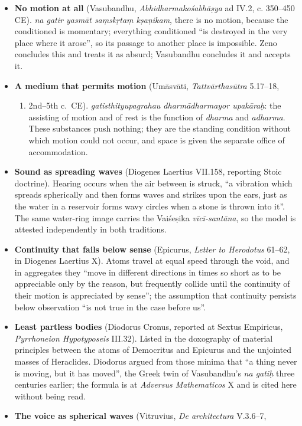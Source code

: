\documentclass[11pt,a4paper]{article}
\newcommand{\tightlist}{\setlength{\itemsep}{0pt}\setlength{\parskip}{0pt}}
\begin{document}
\begin{itemize}
  to 450 CE, argues the point from observation: the axe-blow is still
  heard at a distance after the axe-wood contact has ceased.
\item
  \textbf{No motion at all} (Vasubandhu, \emph{Abhidharmakośabhāṣya} ad
  IV.2, c. 350--450 CE). \emph{na gatir yasmāt saṃskṛtaṃ kṣaṇikam},
  there is no motion, because the conditioned is momentary; everything
  conditioned ``is destroyed in the very place where it arose'', so its
  passage to another place is impossible. Zeno concludes this and treats
  it as absurd; Vasubandhu concludes it and accepts it.
\item
  \textbf{A medium that permits motion} (Umāsvāti,
  \emph{Tattvārthasūtra} 5.17--18,

  \begin{enumerate}
  \def\labelenumi{\alph{enumi}.}
  \setcounter{enumi}{2}
  \tightlist
  \item
    2nd--5th c.~CE). \emph{gatisthityupagrahau dharmādharmayor
    upakāraḥ}: the assisting of motion and of rest is the function of
    \emph{dharma} and \emph{adharma}. These substances push nothing;
    they are the standing condition without which motion could not
    occur, and space is given the separate office of accommodation.
  \end{enumerate}
\item
  \textbf{Sound as spreading waves} (Diogenes Laertius VII.158,
  reporting Stoic doctrine). Hearing occurs when the air between is
  struck, ``a vibration which spreads spherically and then forms waves
  and strikes upon the ears, just as the water in a reservoir forms wavy
  circles when a stone is thrown into it''. The same water-ring image
  carries the Vaiśeṣika \emph{vīcī-santāna}, so the model is attested
  independently in both traditions.
\item
  \textbf{Continuity that fails below sense} (Epicurus, \emph{Letter to
  Herodotus} 61--62, in Diogenes Laertius X). Atoms travel at equal
  speed through the void, and in aggregates they ``move in different
  directions in times so short as to be appreciable only by the reason,
  but frequently collide until the continuity of their motion is
  appreciated by sense''; the assumption that continuity persists below
  observation ``is not true in the case before us''.
\item
  \textbf{Least partless bodies} (Diodorus Cronus, reported at Sextus
  Empiricus, \emph{Pyrrhoneion Hypotyposeis} III.32). Listed in the
  doxography of material principles between the atoms of Democritus and
  Epicurus and the unjointed masses of Heraclides. Diodorus argued from
  those minima that ``a thing never is moving, but it has moved'', the
  Greek twin of Vasubandhu's \emph{na gatiḥ} three centuries earlier;
  the formula is at \emph{Adversus Mathematicos} X and is cited here
  without being read.
\item
  \textbf{The voice as spherical waves} (Vitruvius, \emph{De
  architectura} V.3.6--7,


\end{itemize}
\end{document}
